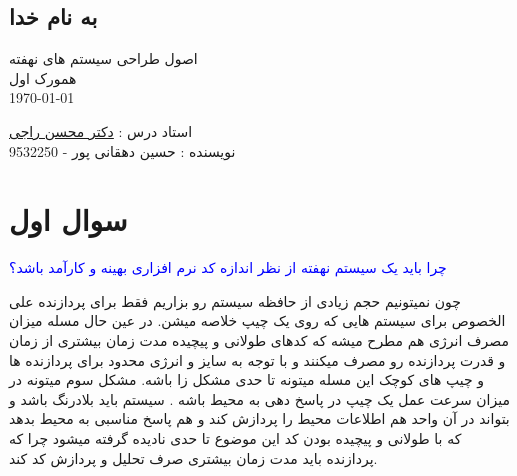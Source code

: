 \documentclass[12pt,a4paper]{article}							   %
\begin{document}
\thispagestyle{empty}

\begin{center}
	\section*{
	 \Huge 
	به نام خدا
	}
	\begin{RTL}
		\large  اصول طراحی سیستم های نهفته\\
		\large همورک اول \\
		\today
	\\[2\baselineskip]
	\end{RTL}
\end{center}



\begin{flushright}
	\begin{RTL} 
استاد درس :  \href{https://www.linkedin.com/in/mohsen-raji-97974452/}{دکتر محسن راجی}\\
 نویسنده : حسین دهقانی پور -   9532250

	
	\end{RTL}
\end{flushright}


\newpage
\tableofcontents
\begin{flushleft}


\end{flushleft}
\newpage

\section{سوال اول}
	\begin{RTL}
		\textcolor{blue}{
چرا باید یک سیستم نهفته از نظر اندازه کد نرم افزاری بهینه و کارآمد باشد؟ \\
		}
		
چون نمیتونیم حجم زیادی از حافظه سیستم رو بزاریم فقط برای پردازنده علی الخصوص برای سیستم هایی که روی یک چیپ خلاصه میشن. در عین حال مسله میزان مصرف انرژی هم مطرح میشه که کدهای طولانی و پیچیده مدت زمان بیشتری از زمان و قدرت پردازنده رو مصرف میکنند و با توجه به سایز و انرژی محدود برای پردازنده ها و چیپ های کوچک این مسله میتونه تا حدی مشکل زا باشه. مشکل سوم میتونه در میزان سرعت عمل یک چیپ در پاسخ دهی به محیط باشه . سیستم باید بلادرنگ باشد و بتواند در آن واحد هم اطلاعات محیط را پردازش کند و هم پاسخ مناسبی به محیط بدهد که با طولانی و پیچیده بودن کد این موضوع تا حدی نادیده گرفته میشود چرا که پردازنده باید مدت زمان بیشتری صرف تحلیل و پردازش کد کند. \\
		
	\end{RTL}
\newpage
\end{document}
